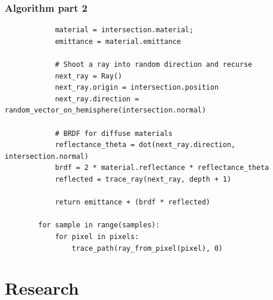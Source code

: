 \documentclass{beamer}
\begin{document}
\begin{frame}[fragile]
    \frametitle{Algorithm part 2}
    \scriptsize
    \begin{verbatim}
            material = intersection.material;
            emittance = material.emittance

            # Shoot a ray into random direction and recurse
            next_ray = Ray()
            next_ray.origin = intersection.position
            next_ray.direction = random_vector_on_hemisphere(intersection.normal)

            # BRDF for diffuse materials
            reflectance_theta = dot(next_ray.direction, intersection.normal)
            brdf = 2 * material.reflectance * reflectance_theta
            reflected = trace_ray(next_ray, depth + 1)

            return emittance + (brdf * reflected)

        for sample in range(samples):
            for pixel in pixels:
                trace_path(ray_from_pixel(pixel), 0)
    \end{verbatim}
\end{frame}

\section{Research}
\end{document}
